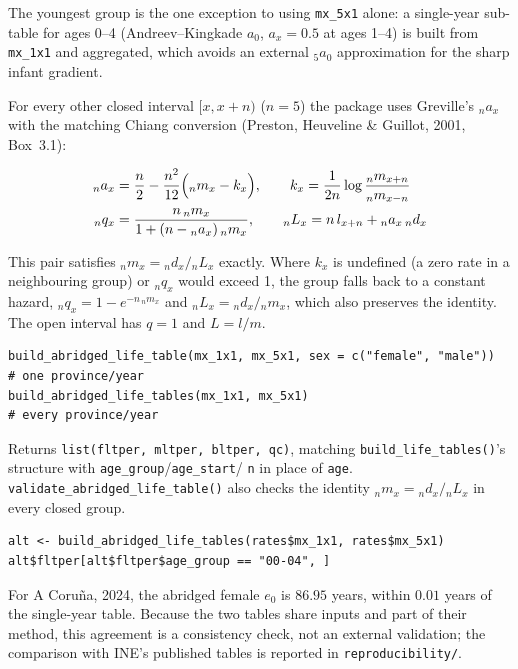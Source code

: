 \documentclass[11pt]{article}
\newcommand{\fn}[1]{\texttt{#1}}
\begin{document}
The youngest group is the one exception to using \fn{mx\_5x1} alone: a
single-year sub-table for ages 0--4 (Andreev--Kingkade $a_0$, $a_x = 0.5$
at ages 1--4) is built from \fn{mx\_1x1} and aggregated, which avoids an
external ${}_5a_0$ approximation for the sharp infant gradient.

For every other closed interval $[x, x+n)$ ($n=5$) the package uses
Greville's ${}_na_x$ with the matching Chiang conversion (Preston, Heuveline
\& Guillot, 2001, Box~3.1):

\begin{align}
{}_na_x &= \frac{n}{2} - \frac{n^2}{12}\Bigl({}_nm_x - k_x\Bigr), \qquad
k_x = \frac{1}{2n}\log\frac{{}_nm_{x+n}}{{}_nm_{x-n}} \\
{}_nq_x &= \frac{n\,{}_nm_x}{1 + (n - {}_na_x)\,{}_nm_x}, \qquad
{}_nL_x = n\, l_{x+n} + {}_na_x\, {}_nd_x
\end{align}

This pair satisfies ${}_nm_x = {}_nd_x / {}_nL_x$ exactly. Where $k_x$ is
undefined (a zero rate in a neighbouring group) or ${}_nq_x$ would exceed 1,
the group falls back to a constant hazard,
${}_nq_x = 1 - e^{-n\,{}_nm_x}$ and ${}_nL_x = {}_nd_x/{}_nm_x$, which also
preserves the identity. The open interval has $q = 1$ and $L = l/m$.

\begin{lstlisting}
build_abridged_life_table(mx_1x1, mx_5x1, sex = c("female", "male"))  # one province/year
build_abridged_life_tables(mx_1x1, mx_5x1)                            # every province/year
\end{lstlisting}

Returns \fn{list(fltper, mltper, bltper, qc)}, matching
\fn{build\_life\_tables()}'s structure with \fn{age\_group}/\fn{age\_start}/
\fn{n} in place of \fn{age}. \fn{validate\_abridged\_life\_table()} also
checks the identity ${}_nm_x = {}_nd_x/{}_nL_x$ in every closed group.

\begin{lstlisting}
alt <- build_abridged_life_tables(rates$mx_1x1, rates$mx_5x1)
alt$fltper[alt$fltper$age_group == "00-04", ]
\end{lstlisting}

For A Coru\~{n}a, 2024, the abridged female $e_0$ is $86.95$ years, within
$0.01$ years of the single-year table. Because the two tables share inputs
and part of their method, this agreement is a consistency check, not an
external validation; the comparison with INE's published tables is reported
in \texttt{reproducibility/}.
\end{document}
